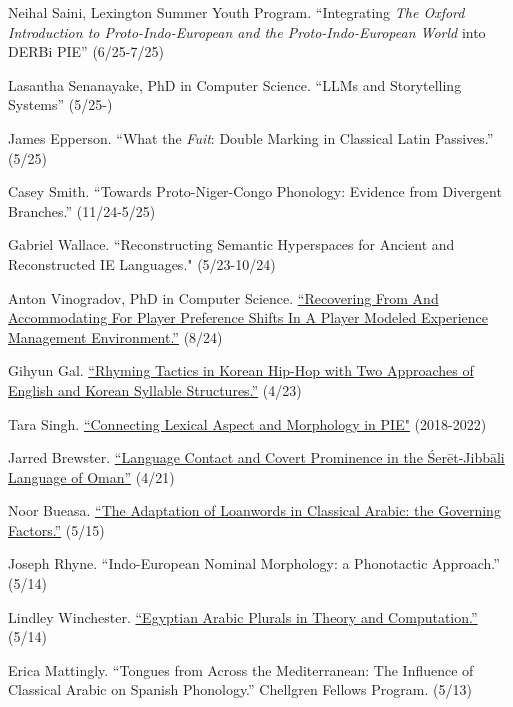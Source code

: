 \documentclass[paper=letter,fontsize=11pt]{scrartcl}
\begin{document}
\begin{etaremune}

\item Neihal Saini, Lexington Summer Youth Program. {``Integrating {\it The Oxford Introduction to Proto-Indo-European and the Proto-Indo-European World} into DERBi PIE''} (6/25-7/25)
\item Lasantha Senanayake, PhD in Computer Science. {``LLMs and Storytelling Systems''} (5/25-)
\item James Epperson. {``What the \textit{Fuit}: Double Marking in Classical 
Latin Passives.''} (5/25)
\item Casey Smith. {``Towards Proto-Niger-Congo Phonology: Evidence
from Divergent Branches.''} (11/24-5/25)
\item Gabriel Wallace. {``Reconstructing Semantic Hyperspaces for Ancient and Reconstructed IE Languages."} (5/23-10/24)
\item Anton Vinogradov, PhD in Computer Science. \href{https://uknowledge.uky.edu/cs_etds/145/}{``Recovering From And Accommodating For Player Preference Shifts In A Player Modeled Experience Management Environment.''} (8/24)
\item Gihyun Gal. \href{https://uknowledge.uky.edu/ltt_etds/54/}{``Rhyming Tactics in Korean Hip-Hop with Two Approaches of English and Korean
Syllable Structures.''} (4/23)
\item Tara Singh. {\href{https://docs.google.com/document/d/1xHEmuhhpM6MCgbzIsouXcADb8B-G9aEuPiX2yxnTHFQ/edit}{``Connecting Lexical Aspect and Morphology in PIE"}} (2018-2022)
\item Jarred Brewster. \href{https://uknowledge.uky.edu/ltt_etds/43/}{``Language Contact and Covert Prominence in the \'{S}er\={e}t-Jibb\={a}li Language of Oman''} (4/21)

\item Noor Bueasa. {\href{https://uknowledge.uky.edu/cgi/viewcontent.cgi?referer=https://www.google.com/&httpsredir=1&article=1006&context=ltt_etds}{“The Adaptation of Loanwords in Classical Arabic: the Governing Factors.”}} (5/15)
\item Joseph Rhyne.  “Indo-European Nominal Morphology: a Phonotactic Approach.” (5/14)
\item Lindley Winchester. {\href{https://uknowledge.uky.edu/ltt_etds/4/}{“Egyptian Arabic Plurals in Theory and Computation.”}} (5/14)
\item Erica Mattingly. “Tongues from Across the Mediterranean: The Influence of Classical Arabic on Spanish Phonology.” Chellgren Fellows Program. (5/13)
\end{etaremune}
\end{document}
